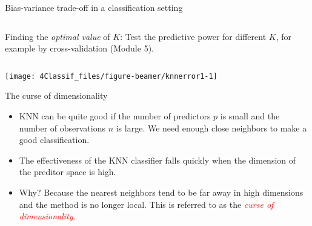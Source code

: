 \documentclass[10pt,ignorenonframetext,]{beamer}
\providecommand{\tightlist}{%
  \setlength{\itemsep}{0pt}\setlength{\parskip}{0pt}}
\begin{document}
\begin{frame}

\begin{block}{Bias-variance trade-off in a classification setting}

\(~\)

Finding the \emph{optimal value} of \(K\): Test the predictive power for
different \(K\), for example by cross-validation (Module 5).

\(~\)

\begin{center}\texttt{[image: 4Classif\_files/figure-beamer/knnerror1-1]} \end{center}

\vspace{2mm}

\end{block}

\end{frame}

\begin{frame}

\begin{block}{The curse of dimensionality}

\vspace{2mm}

\begin{itemize}
\tightlist
\item
  KNN can be quite good if the number of predictors \(p\) is small and
  the number of observations \(n\) is large. We need enough close
  neighbors to make a good classification.
\end{itemize}

\vspace{2mm}

\begin{itemize}
\tightlist
\item
  The effectiveness of the KNN classifier falls quickly when the
  dimension of the preditor space is high.
\end{itemize}

\vspace{2mm}

\begin{itemize}
\tightlist
\item
  Why? Because the nearest neighbors tend to be far away in high
  dimensions and the method is no longer local. This is referred to as
  the \emph{\textcolor{red}{curse of dimensionality}}.
\end{itemize}

\end{block}

\end{frame}
\end{document}
